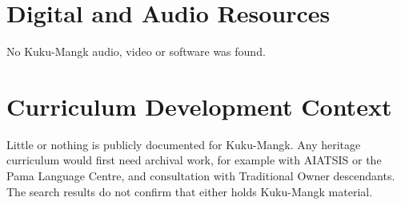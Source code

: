 \documentclass[12pt]{article}
\begin{document}
\section{Digital and Audio Resources}
No Kuku-Mangk audio, video or software was found.

\section{Curriculum Development Context}
Little or nothing is publicly documented for Kuku-Mangk. Any heritage curriculum would first need archival work, for example with AIATSIS or the Pama Language Centre, and consultation with Traditional Owner descendants. The search results do not confirm that either holds Kuku-Mangk material.
\end{document}
